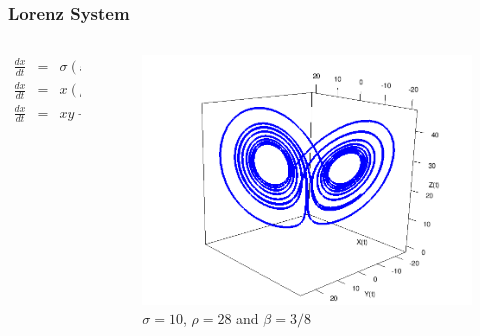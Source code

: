 \documentclass{beamer}
\theoremstyle{definition}
\begin{document}
 \begin{frame}
 \frametitle{Lorenz System}
   
  \begin{columns}[onlytextwidth]
    \begin{column}{0.3\textwidth}
 \begin{eqnarray*} 
  \frac{dx}{dt} &=&\sigma (x-y), \\
  \frac{dx}{dt} &=&x (\rho -z) - y, \\ 
  \frac{dx}{dt} &=&xy - \beta z.
 \end{eqnarray*}
 \end{column} 
  
  \begin{column}{0.63\textwidth}
       \begin{figure}
 \includegraphics[scale=.25]{lorenzattractor}
  \caption{$\sigma=10$, $\rho=28$ and $\beta=3/8$}
       \end{figure}
     \end{column}
  \end{columns}
 \end{frame}
\end{document}
